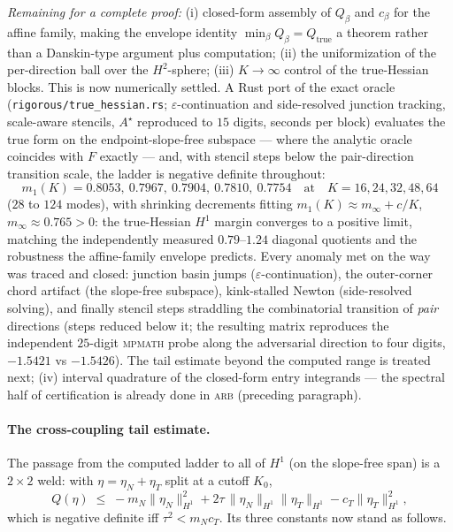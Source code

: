 \documentclass[11pt]{amsart}
\theoremstyle{plain}
\theoremstyle{definition}
\begin{document}
\emph{Remaining for a complete proof:}
(i) closed-form assembly of $Q_{\beta}$ and $c_{\beta}$ for the
affine family, making the envelope identity
$\min_{\beta}Q_{\beta}=Q_{\mathrm{true}}$ a theorem rather than a
Danskin-type argument plus computation;
(ii) the uniformization of the per-direction ball over the
$H^{2}$-sphere;
(iii) $K\to\infty$ control of the true-Hessian blocks.  This is now
numerically settled.  A Rust port of the exact oracle
(\texttt{rigorous/true\_hessian.rs}; $\varepsilon$-continuation and
side-resolved junction tracking, scale-aware stencils, $A^{\star}$
reproduced to $15$ digits, seconds per block) evaluates the true form
on the endpoint-slope-free subspace --- where the analytic oracle
coincides with $F$ exactly --- and, with stencil steps below the
pair-direction transition scale, the ladder is negative definite
throughout:
\[
   m_{1}(K) = 0.8053,\ 0.7967,\ 0.7904,\ 0.7810,\ 0.7754
   \quad\text{at}\quad K = 16, 24, 32, 48, 64
\]
($28$ to $124$ modes), with shrinking decrements fitting
$m_{1}(K)\approx m_{\infty}+c/K$, $m_{\infty}\approx0.765>0$: the
true-Hessian $H^{1}$ margin converges to a positive limit, matching
the independently measured $0.79$--$1.24$ diagonal quotients and the
robustness the affine-family envelope predicts.  Every anomaly met on
the way was traced and closed: junction basin jumps
($\varepsilon$-continuation), the outer-corner chord artifact (the
slope-free subspace), kink-stalled Newton (side-resolved solving),
and finally stencil steps straddling the combinatorial transition of
\emph{pair} directions (steps reduced below it; the resulting matrix
reproduces the independent $25$-digit \textsc{mpmath} probe along the
adversarial direction to four digits, $-1.5421$ vs $-1.5426$).  The
tail estimate beyond the computed range is treated next;
(iv) interval quadrature of the closed-form entry integrands ---
the spectral half of certification is already done in \textsc{arb}
(preceding paragraph).

\paragraph{The cross-coupling tail estimate.}
The passage from the computed ladder to all of $H^{1}$ (on the
slope-free span) is a $2\times2$ weld: with $\eta = \eta_{N} +
\eta_{T}$ split at a cutoff $K_{0}$,
\[
   Q(\eta) \;\leq\; -m_{N}\|\eta_{N}\|^{2}_{H^{1}}
   + 2\tau\,\|\eta_{N}\|_{H^{1}}\|\eta_{T}\|_{H^{1}}
   - c_{T}\|\eta_{T}\|^{2}_{H^{1}},
\]
which is negative definite iff $\tau^{2} < m_{N}c_{T}$.  Its three
constants now stand as follows.
\end{document}
